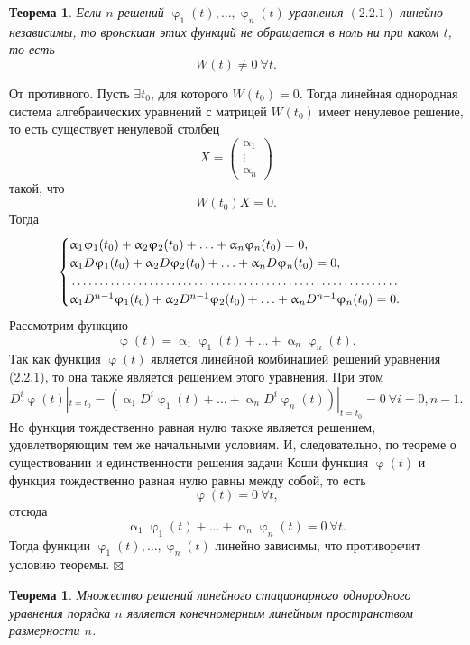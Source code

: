 \documentclass[a4paper, 12pt]{report}
\newenvironment{Proof} %
{\par\noindent{$\blacklozenge$}} %
{\hfill$\scriptstyle\boxtimes$}
\renewcommand{\alpha}{\upalpha}
\renewcommand{\varphi}{\upvarphi}
\begin{document}
	\newtheorem*{2_2_2}{Теорема} \begin{2_2_2} Если $n$ решений $\varphi_1(t), \ldots, \varphi_n(t)$ уравнения $(2.2.1)$ линейно независимы, то вронскиан этих функций не обращается в ноль ни при каком $t$, то есть $$W(t) \ne 0\ \forall t.$$
	\end{2_2_2} \begin{Proof}
		От противного. Пусть $\exists t_0$, для которого $W(t_0) = 0$. Тогда линейная однородная система алгебраических уравнений с матрицей $W(t_0)$ имеет ненулевое решение, то есть существует ненулевой столбец $$X = \begin{pmatrix}
			\alpha_1 \\ \vdots \\ \alpha_n
		\end{pmatrix}$$ такой, что $$W(t_0)X = 0.$$ Тогда $$\begin{cases}
			\alpha_1\varphi_1(t_0) + \alpha_2\varphi_2(t_0) + \ldots + \alpha_n\varphi_n(t_0) = 0,\\
			\alpha_1D\varphi_1(t_0) + \alpha_2D\varphi_2(t_0) + \ldots + \alpha_nD\varphi_n(t_0) = 0,\\
			\dotfill\\
			\alpha_1D^{n-1}\varphi_1(t_0) + \alpha_2D^{n-1}\varphi_2(t_0) + \ldots + \alpha_nD^{n-1}\varphi_n(t_0) = 0.
		\end{cases}$$ Рассмотрим функцию $$\varphi(t) = \alpha_1\varphi_1(t) + \ldots + \alpha_n\varphi_n(t).$$ Так как функция $\varphi(t)$ является линейной комбинацией решений уравнения (2.2.1), то она также является решением этого уравнения. При этом $$D^i\varphi(t)|_{t=t_0} = (\alpha_1D^i\varphi_1(t) + \ldots + \alpha_nD^i\varphi_n(t))|_{t=t_0} = 0\ \forall i = \overline{0, n-1}.$$
		Но функция тождественно равная нулю также является решением, удовлетворяющим тем же начальными условиям. И, следовательно, по теореме о существовании и единственности решения задачи Коши функция $\varphi(t)$ и функция тождественно равная нулю равны между собой, то есть $$\varphi(t) = 0\ \forall t ,$$ отсюда $$\alpha_1\varphi_1(t) + \ldots + \alpha_n\varphi_n(t) = 0\ \forall t.$$ Тогда функции $\varphi_1(t),\ldots,\varphi_n(t)$ линейно зависимы, что противоречит условию теоремы.
	\end{Proof}
	\newtheorem*{2_2_3}{Теорема}\begin{2_2_3}
		Множество решений линейного стационарного однородного уравнения порядка $n$ является конечномерным линейным пространством размерности $n$.
	\end{2_2_3}
\end{document}
